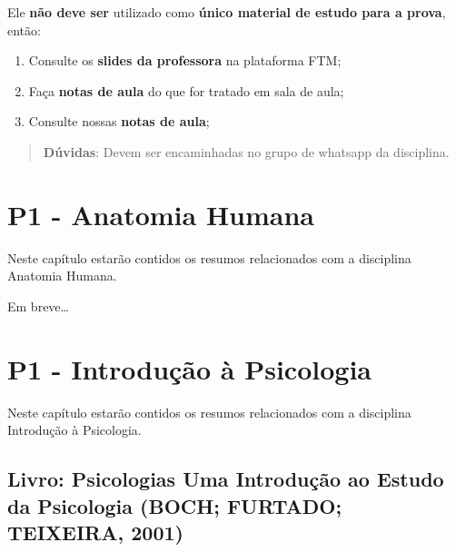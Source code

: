 \documentclass[
]{book}
\providecommand{\tightlist}{%
  \setlength{\itemsep}{0pt}\setlength{\parskip}{0pt}}
\begin{document}
Ele \textbf{não deve ser} utilizado como \textbf{único material de estudo para a prova}, então:

\begin{enumerate}
\def\labelenumi{\arabic{enumi}.}
\tightlist
\item
  Consulte os \textbf{slides da professora} na plataforma FTM;\\
\item
  Faça \textbf{notas de aula} do que for tratado em sala de aula;\\
\item
  Consulte nossas \textbf{notas de aula};
\end{enumerate}

\begin{quote}
\textbf{Dúvidas}: Devem ser encaminhadas no grupo de whatsapp da disciplina.
\end{quote}

\hypertarget{p1---anatomia-humana}{%
\chapter{P1 - Anatomia Humana}\label{p1---anatomia-humana}}

Neste capítulo estarão contidos os resumos relacionados com a disciplina Anatomia Humana.

Em breve\ldots{}

\hypertarget{p1---introduuxe7uxe3o-uxe0-psicologia}{%
\chapter{P1 - Introdução à Psicologia}\label{p1---introduuxe7uxe3o-uxe0-psicologia}}

Neste capítulo estarão contidos os resumos relacionados com a disciplina Introdução à Psicologia.

\hypertarget{livro-psicologias-uma-introduuxe7uxe3o-ao-estudo-da-psicologia-boch-furtado-teixeira-2001}{%
\section{\texorpdfstring{Livro: \textbf{Psicologias Uma Introdução ao Estudo da Psicologia} (BOCH; FURTADO; TEIXEIRA, 2001)}{Livro: Psicologias Uma Introdução ao Estudo da Psicologia (BOCH; FURTADO; TEIXEIRA, 2001)}}\label{livro-psicologias-uma-introduuxe7uxe3o-ao-estudo-da-psicologia-boch-furtado-teixeira-2001}}
\end{document}
